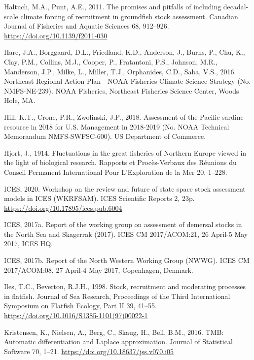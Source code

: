 \documentclass[]{article}
\begin{document}
\leavevmode\hypertarget{ref-haltuch2011Promises}{}%
Haltuch, M.A., Punt, A.E., 2011. The promises and pitfalls of including
decadal-scale climate forcing of recruitment in groundfish stock
assessment. Canadian Journal of Fisheries and Aquatic Sciences 68,
912--926. \url{https://doi.org/10.1139/f2011-030}

\leavevmode\hypertarget{ref-hare2016Northeast}{}%
Hare, J.A., Borggaard, D.L., Friedland, K.D., Anderson, J., Burns, P.,
Chu, K., Clay, P.M., Collins, M.J., Cooper, P., Fratantoni, P.S.,
Johnson, M.R., Manderson, J.P., Milke, L., Miller, T.J., Orphanides,
C.D., Saba, V.S., 2016. Northeast Regional Action Plan - NOAA Fisheries
Climate Science Strategy (No. NMFS-NE-239). NOAA Fisheries, Northeast
Fisheries Science Center, Woods Hole, MA.

\leavevmode\hypertarget{ref-hill2018Assessment}{}%
Hill, K.T., Crone, P.R., Zwolinski, J.P., 2018. Assessment of the
Pacific sardine resource in 2018 for U.S. Management in 2018-2019 (No.
NOAA Technical Memorandum NMFS-SWFSC-600). US Department of Commerce.

\leavevmode\hypertarget{ref-hjort1914Fluctuations}{}%
Hjort, J., 1914. Fluctuations in the great fisheries of Northern Europe
viewed in the light of biological research. Rapports et Procès-Verbaux
des Réunions du Conseil Permanent International Pour L'Exploration de la
Mer 20, 1--228.

\leavevmode\hypertarget{ref-ices2020Workshop}{}%
ICES, 2020. Workshop on the review and future of state space stock
assessment models in ICES (WKRFSAM). ICES Scientific Reports 2, 23p.
\url{https://doi.org/10.17895/ices.pub.6004}

\leavevmode\hypertarget{ref-ices2017Report}{}%
ICES, 2017a. Report of the working group on assessment of demersal
stocks in the North Sea and Skagerrak (2017). ICES CM 2017/ACOM:21, 26
April-5 May 2017, ICES HQ.

\leavevmode\hypertarget{ref-ices2017Reporta}{}%
ICES, 2017b. Report of the North Western Working Group (NWWG). ICES CM
2017/ACOM:08, 27 April-4 May 2017, Copenhagen, Denmark.

\leavevmode\hypertarget{ref-iles1998Stock}{}%
Iles, T.C., Beverton, R.J.H., 1998. Stock, recruitment and moderating
processes in flatfish. Journal of Sea Research, Proceedings of the Third
International Symposium on Flatfish Ecology, Part II 39, 41--55.
\url{https://doi.org/10.1016/S1385-1101(97)00022-1}

\leavevmode\hypertarget{ref-kristensen2016TMB}{}%
Kristensen, K., Nielsen, A., Berg, C., Skaug, H., Bell, B.M., 2016. TMB:
Automatic differentiation and Laplace approximation. Journal of
Statistical Software 70, 1--21.
\url{https://doi.org/10.18637/jss.v070.i05}
\end{document}
